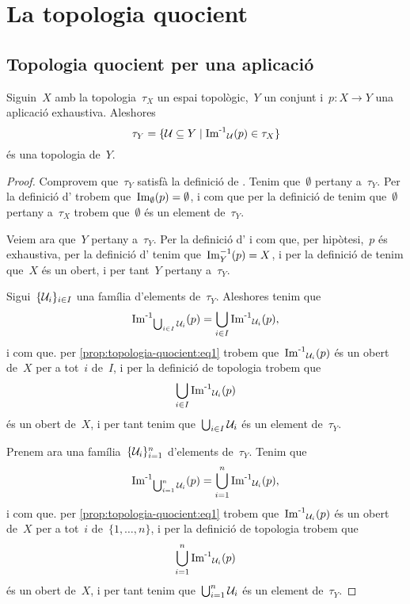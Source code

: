 \documentclass[../topologia.tex]{subfiles}
\begin{document}
\section{La topologia quocient}
    \subsection{Topologia quocient per una aplicació}
    \begin{proposition}
        \label{prop:topologia-quocient}
        Siguin~\(X\) amb la topologia~\(\tau_{X}\) un espai topològic,~\(Y\) un conjunt i~\(p\colon X\longrightarrow Y\) una aplicació exhaustiva.
        Aleshores
        \begin{equation}
            \label{prop:topologia-quocient:eq1}
            \tau_{Y}=\{\mathcal{U}\subseteq Y\mid\operatorname{\operatorname{Im}^{-1}}_{\mathcal{U}}(p)\in\tau_{X}\}
        \end{equation}
        és una topologia de~\(Y\).
    \end{proposition}
    \begin{proof} %
        Comprovem que~\(\tau_{Y}\) satisfà la definició de .
        Tenim que~\(\emptyset\) pertany a~\(\tau_{Y}\).
        Per la definició d' trobem que~\(\operatorname{Im}_{\emptyset}(p)=\emptyset\), i com que per la definició de  tenim que~\(\emptyset\) pertany a~\(\tau_{X}\) trobem que~\(\emptyset\) és un element de~\(\tau_{Y}\).

        Veiem ara que~\(Y\) pertany a~\(\tau_{Y}\).
        Per la definició d' i com que, per hipòtesi,~\(p\) és exhaustiva, per la definició d' tenim que~\(\operatorname{Im}_{Y}^{-1}(p)=X\), i per la definició de  tenim que~\(X\) és un obert, i per tant~\(Y\) pertany a~\(\tau_{Y}\).

        Sigui~\(\{\mathcal{U}_{i}\}_{i\in I}\) una família d'elements de~\(\tau_{Y}\).
        Aleshores tenim que
        \[
            \operatorname{\operatorname{Im}^{-1}}_{\bigcup_{i\in I}\mathcal{U}_{i}}(p)=\bigcup_{i\in I}\operatorname{\operatorname{Im}^{-1}}_{\mathcal{U}_{i}}(p),
        \]
        i com que.
        per \eqref{prop:topologia-quocient:eq1} trobem que~\(\operatorname{\operatorname{Im}^{-1}}_{\mathcal{U}_{i}}(p)\) és un obert de~\(X\) per a tot~\(i\) de~\(I\), i per la definició de topologia trobem que
        \[
            \bigcup_{i\in I}\operatorname{\operatorname{Im}^{-1}}_{\mathcal{U}_{i}}(p)
        \]
        és un obert de~\(X\), i per tant tenim que~\(\bigcup_{i\in I}\mathcal{U}_{i}\) és un element de~\(\tau_{Y}\).

        Prenem ara una família~\(\{\mathcal{U}_{i}\}_{i=1}^{n}\) d'elements de~\(\tau_{Y}\).
        Tenim que
        \[
            \operatorname{\operatorname{Im}^{-1}}_{\bigcup_{i=1}^{n}\mathcal{U}_{i}}(p)=\bigcup_{i=1}^{n}\operatorname{\operatorname{Im}^{-1}}_{\mathcal{U}_{i}}(p),
        \]
        i com que.
        per \eqref{prop:topologia-quocient:eq1} trobem que~\(\operatorname{\operatorname{Im}^{-1}}_{\mathcal{U}_{i}}(p)\) és un obert de~\(X\) per a tot~\(i\) de~\(\{1,\dots,n\}\), i per la definició de topologia trobem que
        \[
            \bigcup_{i=1}^{n}\operatorname{\operatorname{Im}^{-1}}_{\mathcal{U}_{i}}(p)
        \]
        és un obert de~\(X\), i per tant tenim que~\(\bigcup_{i=1}^{n}\mathcal{U}_{i}\) és un element de~\(\tau_{Y}\).
    \end{proof}
\end{document}
